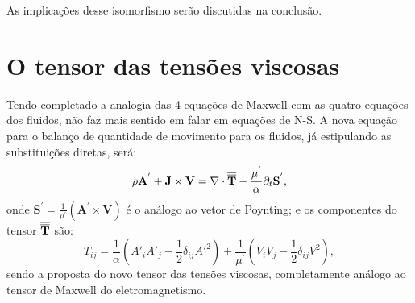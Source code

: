 As implicações desse isomorfismo serão discutidas na conclusão.

\section{O tensor das tensões viscosas}
Tendo completado a analogia das 4 equações de Maxwell com as quatro equações dos fluidos, não faz mais sentido em falar em equações de N-S. A nova equação para o balanço de quantidade de movimento para os fluidos, já estipulando as substituições diretas, será:
\begin{equation}\label{balanço_de_momento_fluido}
    \rho \textbf{A}^{'} + \textbf{J} \times \textbf{V} = \nabla \cdot \overline{\overline{\textbf{T}}} -\frac{\mu^{'}}{\alpha}\partial_{t}\textbf{S}^{'},
\end{equation}
onde $\textbf{S}^{'} = \frac{1}{\mu^{'}} (\textbf{A}^{'}\times\textbf{V})$ é o análogo ao vetor de Poynting; e os componentes do tensor $\overline{\overline{\textbf{T}}}$ são:
\begin{equation}\label{Tensor de maxwell}
T_{ij} = \frac{1}{\alpha}\left(A'_{i}A'_{j} - \frac{1}{2}\delta_{ij}A'^{2}\right) + \frac{1}{\mu^{'}}\left(V_{i}V_{j} - \frac{1}{2}\delta_{ij}V^{2}\right),
\end{equation}
sendo a proposta do novo tensor das tensões viscosas, completamente análogo ao tensor de Maxwell do eletromagnetismo.
